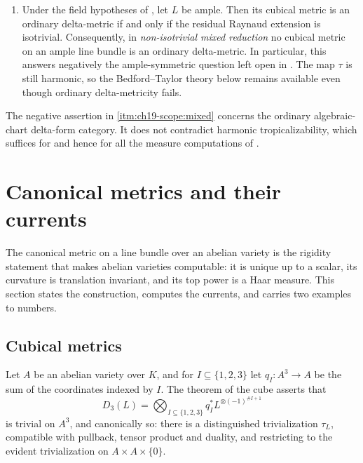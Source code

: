 \begin{remark}
\begin{enumerate}
 on $L$ is an ordinary delta-metric.  This conclusion is independent of
 the reduction type and of isotriviality.
\item\label{itm:ch19-scope:mixed} Under the field hypotheses of
 , let $L$ be ample.  Then its
 cubical metric is an ordinary delta-metric if and only if the residual
 Raynaud extension is isotrivial.  Consequently, in \emph{non-isotrivial
 mixed reduction} no cubical metric on an ample line bundle is an ordinary
 delta-metric.  In particular, this answers negatively the ample-symmetric
 question left open in \cite[Remark~16.4 and \S17]{GJR26}.  The map
 $\tau$ is still harmonic, so the Bedford--Taylor theory below remains
 available even though ordinary delta-metricity fails.
\end{enumerate}
The negative assertion in \cref{itm:ch19-scope:mixed} concerns the ordinary
algebraic-chart delta-form category.  It does not contradict harmonic
tropicalizability, which suffices for
 and hence for all the measure
computations of .
\end{remark}

\section{Canonical metrics and their currents}
\label{sec:ch19-canonical}

The canonical metric on a line bundle over an abelian variety is the
rigidity statement that makes abelian varieties computable: it is unique up
to a scalar, its curvature is translation invariant, and its top power is a
Haar measure.  This section states the construction, computes the currents,
and carries two examples to numbers.

\subsection{Cubical metrics}
\label{sec:ch19-cubical}

Let $A$ be an abelian variety over $K$, and for $I\subseteq\{1,2,3\}$
let $q_I:A^3\to A$ be the sum of the coordinates indexed by $I$.  The
theorem of the cube asserts that
\begin{equation}
\label{eq:ch19-cube-bundle}
 D_3(L)=\bigotimes_{I\subseteq\{1,2,3\}}q_I^*L^{\otimes(-1)^{\#I+1}}
\end{equation}
is trivial on $A^3$, and canonically so: there is a distinguished
trivialization $\tau_L$, compatible with pullback, tensor product and
duality, and restricting to the evident trivialization on
$A\times A\times\{0\}$.

